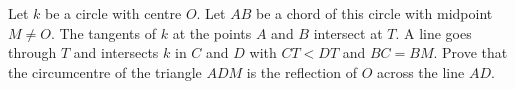 Let $k$ be a circle with centre $O$.
Let $AB$ be a chord of this circle with midpoint $M \neq O$.
The tangents of $k$ at the points $A$ and $B$ intersect at $T$.
A line goes through $T$ and intersects $k$ in $C$ and $D$ with $CT < DT$ and $BC = BM$.
Prove that the circumcentre of the triangle $ADM$ is the reflection of $O$ across the line $AD$.
